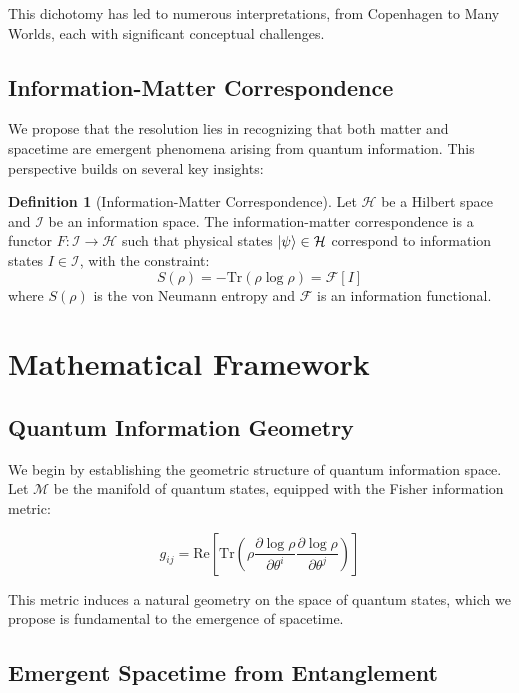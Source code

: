\documentclass[12pt,a4paper]{article}
\theoremstyle{definition}
\newtheorem{definition}{Definition}[section]
\begin{document}
This dichotomy has led to numerous interpretations, from Copenhagen to Many Worlds, each with significant conceptual challenges.

\subsection{Information-Matter Correspondence}

We propose that the resolution lies in recognizing that both matter and spacetime are emergent phenomena arising from quantum information. This perspective builds on several key insights:

\begin{definition}[Information-Matter Correspondence]
Let $\mathcal{H}$ be a Hilbert space and $\mathcal{I}$ be an information space. The information-matter correspondence is a functor $F: \mathcal{I} \rightarrow \mathcal{H}$ such that physical states $\ket{\psi} \in \mathcal{H}$ correspond to information states $I \in \mathcal{I}$, with the constraint:
\begin{equation}
S(\rho) = -\text{Tr}(\rho \log \rho) = \mathcal{F}[I]
\end{equation}
where $S(\rho)$ is the von Neumann entropy and $\mathcal{F}$ is an information functional.
\end{definition}

\section{Mathematical Framework}

\subsection{Quantum Information Geometry}

We begin by establishing the geometric structure of quantum information space. Let $\mathcal{M}$ be the manifold of quantum states, equipped with the Fisher information metric:

\begin{equation}
g_{ij} = \text{Re}\left[\text{Tr}\left(\rho \frac{\partial \log \rho}{\partial \theta^i} \frac{\partial \log \rho}{\partial \theta^j}\right)\right]
\end{equation}

This metric induces a natural geometry on the space of quantum states, which we propose is fundamental to the emergence of spacetime.

\subsection{Emergent Spacetime from Entanglement}
\end{document}
